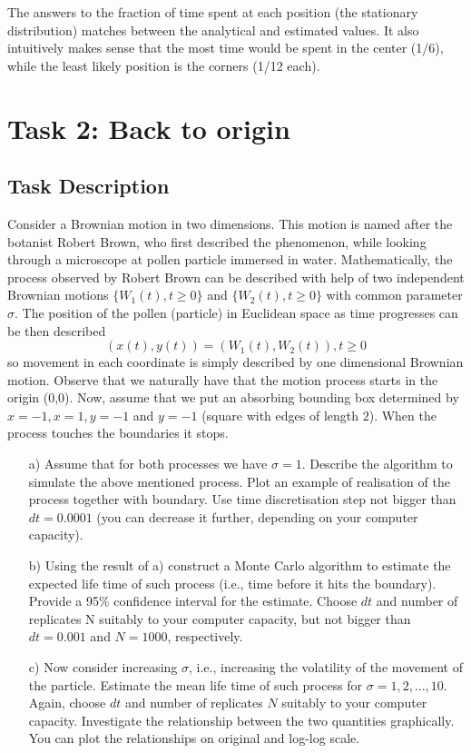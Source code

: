 
The answers to the fraction of time spent at each position (the stationary distribution) matches between the analytical and estimated values. It also intuitively makes sense that the most time would be spent in the center (1/6), while the least likely position is the corners (1/12 each).

\newpage
\section{Task 2: Back to origin}
\label{task2a}

\subsection{Task Description}
\label{sec:desc2}


Consider a Brownian motion in two dimensions. This motion is named after the botanist Robert Brown,
who first described the phenomenon, while looking through a microscope at pollen particle immersed
in water. Mathematically, the process observed by Robert Brown can be described with help of two
independent Brownian motions $\{ W_1 (t), t \geq 0 \}$ and $\{ W_2 (t), t \geq 0 \}$ with common parameter $\sigma$. The
position of the pollen (particle) in Euclidean space as time progresses can be then described
$$
(x(t), y(t)) = (W_1 (t), W_2 (t)) , t \geq 0
$$
so movement in each coordinate is simply described by one dimensional Brownian motion. Observe that
we naturally have that the motion process starts in the origin (0,0). Now, assume that we put an absorbing
bounding box determined by $x = -1, x = 1, y = -1$ and $y = -1$ (square with edges of length $2$). When
the process touches the boundaries it stops.

\begin{itemize}
    \item[a)] Assume that for both processes we have $\sigma = 1$. Describe the algorithm to simulate the above
mentioned process. Plot an example of realisation of the process together with boundary. Use time
discretisation step not bigger than $dt = 0.0001$ (you can decrease it further, depending on your
computer capacity).
    \item[b)] Using the result of a) construct a Monte Carlo algorithm to estimate the expected life time of such
process (i.e., time before it hits the boundary). Provide a 95\% confidence interval for the estimate.
Choose $dt$ and number of replicates N suitably to your computer capacity, but not bigger than
$dt = 0.001$ and $N = 1000$, respectively.
    \item[c)] Now consider increasing $\sigma$, i.e., increasing the volatility of the movement of the particle. Estimate the
mean life time of such process for $\sigma = 1, 2, . . . , 10$. Again, choose $dt$ and number of replicates $N$ suitably to your computer capacity. Investigate the relationship between the two quantities graphically.
You can plot the relationships on original and log-log scale.
\end{itemize}

